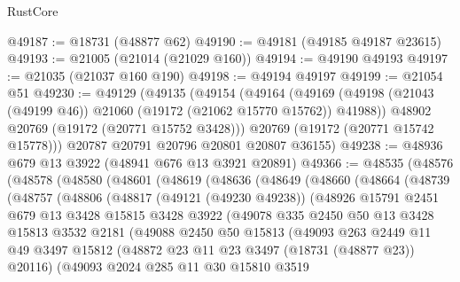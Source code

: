 \begin{lexlean}{RustCore}
\begin{coremodule}
@49187 := @18731 (@48877 @62)
@49190 := @49181 (@49185 @49187 @23615)
@49193 := @21005 (@21014 (@21029 @160))
@49194 := @49190 @49193
@49197 := @21035 (@21037 @160 @190)
@49198 := @49194 @49197
@49199 := @21054 @51
@49230 := @49129
    (@49135
      (@49154
        (@49164
          (@49169 (@49198 (@21043 (@49199 @46)) @21060 (@19172 (@21062 @15770 @15762)) @41988))
          @48902
          @20769
          (@19172 (@20771 @15752 @3428)))
        @20769
        (@19172 (@20771 @15742 @15778)))
      @20787
      @20791
      @20796
      @20801
      @20807
      @36155)
@49238 := @48936 @679 @13 @3922 (@48941 @676 @13 @3921 @20891)
@49366 := @48535
    (@48576
      (@48578
        (@48580
          (@48601
            (@48619
              (@48636
                (@48649
                  (@48660
                    (@48664
                      (@48739
                        (@48757
                          (@48806
                            (@48817
                              (@49121 (@49230 @49238))
                              (@48926
                                @15791
                                @2451
                                @679
                                @13
                                @3428
                                @15815
                                @3428
                                @3922
                                (@49078
                                  @335
                                  @2450
                                  @50
                                  @13
                                  @3428
                                  @15813
                                  @3532
                                  @2181
                                  (@49088
                                    @2450
                                    @50
                                    @15813
                                    (@49093
                                      @263
                                      @2449
                                      @11
                                      @49
                                      @3497
                                      @15812
                                      (@48872 @23 @11 @23 @3497 (@18731 (@48877 @23)) @20116)
                                      (@49093
                                        @2024
                                        @285
                                        @11
                                        @30
                                        @15810
                                        @3519

\end{coremodule}
\end{lexlean}
